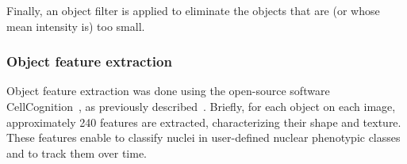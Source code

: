Finally, an object filter is applied to eliminate the objects that are (or whose mean intensity is) too small.

\subsubsection{Object feature extraction}
Object feature extraction was done using the open-source software CellCognition~\cite{cellcognition}, as previously described~\cite{Walter2010}. Briefly, for each object on each image, approximately 240 features are extracted, characterizing their shape and texture. These features enable to classify nuclei in user-defined nuclear phenotypic classes and to track them over time.

